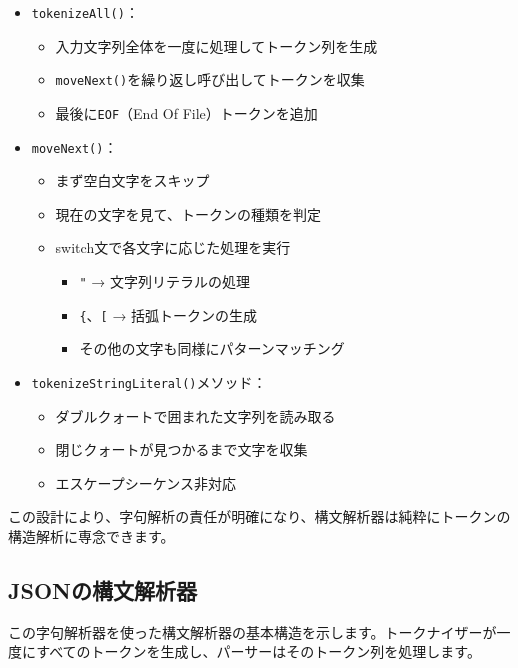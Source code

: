 \begin{itemize}
\item
  \texttt{tokenizeAll()}：

  \begin{itemize}
  \item
    入力文字列全体を一度に処理してトークン列を生成
  \item
    \texttt{moveNext()}を繰り返し呼び出してトークンを収集
  \item
    最後に\texttt{EOF}（End Of File）トークンを追加
  \end{itemize}
\item
  \texttt{moveNext()}：

  \begin{itemize}
  \item
    まず空白文字をスキップ
  \item
    現在の文字を見て、トークンの種類を判定
  \item
    switch文で各文字に応じた処理を実行

    \begin{itemize}
    \item
      \texttt{"} → 文字列リテラルの処理
    \item
      \texttt{\{}、\texttt{{[}} → 括弧トークンの生成
    \item
      その他の文字も同様にパターンマッチング
    \end{itemize}
  \end{itemize}
\item
  \texttt{tokenizeStringLiteral()}メソッド：

  \begin{itemize}
  \item
    ダブルクォートで囲まれた文字列を読み取る
  \item
    閉じクォートが見つかるまで文字を収集
  \item
    エスケープシーケンス非対応
  \end{itemize}
\end{itemize}

この設計により、字句解析の責任が明確になり、構文解析器は純粋にトークンの構造解析に専念できます。

\subsection{JSONの構文解析器}

この字句解析器を使った構文解析器の基本構造を示します。トークナイザーが一度にすべてのトークンを生成し、パーサーはそのトークン列を処理します。

